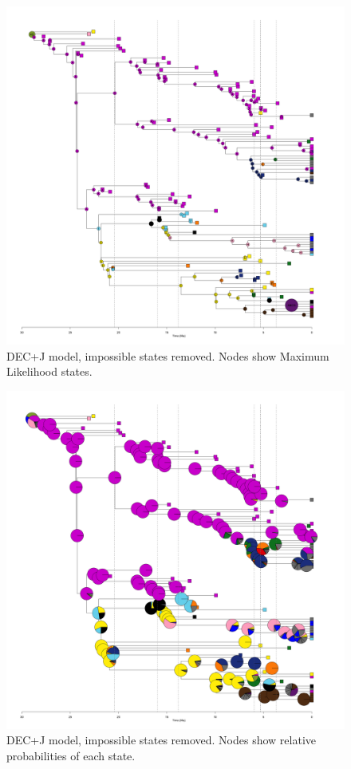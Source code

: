 \documentclass[a4paper, 12pt]{article}
\begin{document}
\begin{figure}[H]
 \centering
  \includegraphics[width = \linewidth]{figures/all-pinnipeds-DECj-impossible-MLstates.png}
  \caption{DEC+J model, impossible states removed. Nodes show Maximum Likelihood states.}
  \label{fig-all-decj-ml}
\end{figure} 

\begin{figure}[H]
 \centering
  \includegraphics[width = \linewidth]{figures/all-pinnipeds-DECj-impossible-pies.png}
  \caption{DEC+J model, impossible states removed. Nodes show relative probabilities of each state.}
  \label{fig-all-decj-pie}
\end{figure} 
 
\end{document}
